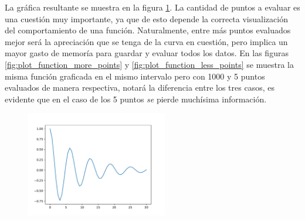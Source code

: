 La gráfica resultante se muestra en la figura \ref{fig:plot_function}. La cantidad de puntos 
a evaluar es una cuestión muy importante, ya que de esto depende la correcta visualización del 
comportamiento de una función. Naturalmente, entre más puntos evaluados mejor será la apreciación 
que se tenga de la curva en cuestión, pero implica un mayor gasto de memoría para guardar y evaluar 
todos los datos. En las figuras \ref{fig:plot_function_more_points} y \ref{fig:plot_function_less_points} 
se muestra la misma función graficada en el mismo intervalo pero con 1000 y 5 puntos evaluados 
de manera respectiva, notará la diferencia entre los tres casos, es evidente que en el caso de los 
5 puntos \textit{se} pierde muchísima información.

\begin{figure}[h!]
\centering
\includegraphics[width=0.55\textwidth]{img/ch03/plot_function.pdf}
\label{fig:plot_function}
\end{figure}

